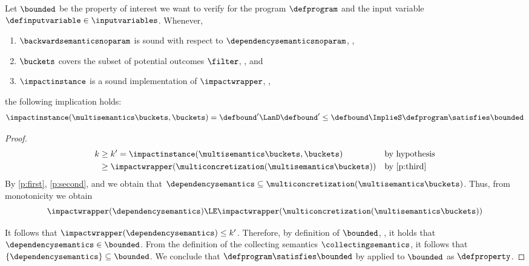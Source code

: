 \begin{theorem}[Soundness] 
  Let $\bounded$ be the property of interest we want to verify for the program $\defprogram$ and the input variable $\definputvariable\in\inputvariables$.
  Whenever,
  \begin{enumerate}[label=(\roman*)]
    \item \label{p:first} $\backwardsemanticsnoparam$ is sound with respect to $\dependencysemanticsnoparam$, \cf{} ,
    \item \label{p:second} $\buckets$ covers the subset of potential outcomes $\filter$, \cf{} , and
    \item \label{p:third} $\impactinstance$ is a sound implementation of $\impactwrapper$, \cf{} ,
  \end{enumerate}
  the following implication holds:
  \begin{align*}
    \impactinstance(\multisemantics\buckets, \buckets) = \defbound' \LanD \defbound' \le \defbound \ImplieS \defprogram \satisfies \bounded
  \end{align*}
\end{theorem}
\begin{proof}
  \begin{align*}
    k &\ge k' = \impactinstance(\multisemantics\buckets, \buckets)
      && \text{by hypothesis} \\
    &\ge \impactwrapper(\multiconcretization(\multisemantics\buckets))
      && \text{by \ref{p:third}}
  \end{align*}
  By \ref{p:first}, \ref{p:second}, and  we obtain that $\dependencysemantics \subseteq \multiconcretization(\multisemantics\buckets)$. Thus, from monotonicity we obtain
  \[\impactwrapper(\dependencysemantics) \LE \impactwrapper(\multiconcretization(\multisemantics\buckets))\]

  It follows that $\impactwrapper(\dependencysemantics) \le k'$.
  Therefore, by definition of $\bounded$, \cf{} , it holds that $\dependencysemantics \in \bounded$.
  From the definition of the collecting semantics $\collectingsemantics$, it follows that $\{\dependencysemantics\} \subseteq \bounded$.
  We conclude that $\defprogram \satisfies \bounded$ by  applied to $\bounded$ as $\defproperty$.
\end{proof}


